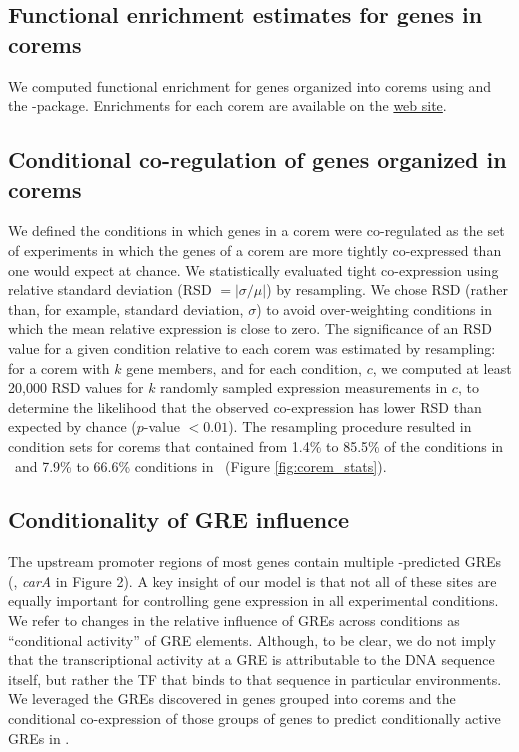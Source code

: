 \subsection{Functional enrichment estimates for genes in corems}

We computed functional enrichment for genes organized into corems
using  \cite{Dennis2003} and the
 \cite{Day2010}
-package. Enrichments for each corem are available on the
\href{http://egrin2.systemsbiology.net}{web site}.

\subsection{Conditional co-regulation of genes organized in corems}
\label{section:rsd}

We defined the conditions in which genes in a corem were co-regulated
as the set of experiments in which the genes of a corem are more
tightly co-expressed than one would expect at chance. We statistically
evaluated tight co-expression using relative standard deviation (RSD 
$=|\sigma/\mu|$) by resampling. We chose RSD (rather than, for example,
standard deviation, $\sigma$) to avoid over-weighting conditions in which the
mean relative expression is close to zero. The significance of an RSD
value for a given condition relative to each corem was estimated
by resampling: for a corem with $k$ gene members, and for each
condition, $c$, we computed at least 20,000 RSD values for $k$ randomly
sampled expression measurements in $c$, to determine the likelihood that the
observed co-expression has lower RSD than expected by chance ($p$-value
$< 0.01$). The resampling procedure resulted in condition sets for
corems that contained from 1.4\% to 85.5\% of the conditions in
\halo\ and 7.9\% to 66.6\% conditions in \eco\ (Figure \ref{fig:corem_stats}).

\subsection{Conditionality of GRE influence}

The upstream promoter regions of most genes contain multiple
\egrine-predicted GREs (\eg, \textit{carA} in Figure 2). A key insight
of our model is that not all of these sites are equally important for
controlling gene expression in all experimental conditions. We refer
to changes in the relative influence of GREs across conditions as
``conditional activity'' of GRE elements. Although, to be clear, we do
not imply that the transcriptional activity at a GRE is attributable
to the DNA sequence itself, but rather the TF that binds to that
sequence in particular environments. We leveraged the GREs discovered
in genes grouped into corems and the conditional co-expression of
those groups of genes to predict conditionally active GREs in \egrine.

